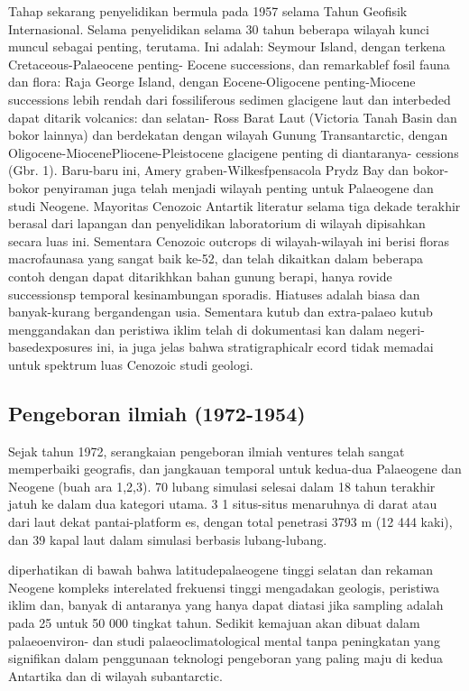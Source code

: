 		Tahap sekarang penyelidikan bermula pada 1957 selama Tahun Geofisik Internasional. Selama penyelidikan selama 30 tahun beberapa wilayah kunci 
	muncul sebagai penting, terutama. Ini adalah: Seymour Island, dengan terkena Cretaceous-Palaeocene penting- Eocene successions, dan remarkablef 
	fosil fauna dan flora: Raja George Island, dengan Eocene-Oligocene penting-Miocene successions lebih rendah dari fossiliferous sedimen glacigene 
	laut dan interbeded dapat ditarik volcanics: dan selatan- Ross Barat Laut (Victoria Tanah Basin dan bokor lainnya) dan berdekatan dengan wilayah 
	Gunung Transantarctic, dengan Oligocene-MiocenePliocene-Pleistocene glacigene penting di diantaranya- cessions (Gbr. 1). 
	Baru-baru ini, Amery graben-Wilkesfpensacola Prydz Bay dan bokor-bokor penyiraman juga telah menjadi wilayah penting untuk Palaeogene dan studi Neogene. 
	Mayoritas Cenozoic Antartik literatur selama tiga dekade terakhir berasal dari lapangan dan penyelidikan laboratorium di wilayah dipisahkan secara luas ini.
	Sementara Cenozoic outcrops di wilayah-wilayah ini berisi floras macrofaunasa yang sangat baik ke-52, dan telah dikaitkan dalam beberapa contoh dengan 
	dapat ditarikhkan bahan gunung berapi, hanya rovide successionsp temporal kesinambungan sporadis. Hiatuses adalah biasa dan banyak-kurang bergandengan usia. 
	Sementara kutub dan extra-palaeo kutub menggandakan dan peristiwa iklim telah di dokumentasi kan dalam negeri-basedexposures ini, 
	ia juga jelas bahwa stratigraphicalr ecord tidak memadai untuk spektrum luas Cenozoic studi geologi.
	
	
\subsection{Pengeboran ilmiah (1972-1954)}

		Sejak tahun 1972, serangkaian pengeboran ilmiah ventures telah sangat memperbaiki geografis, dan jangkauan temporal untuk kedua-dua Palaeogene 
	dan Neogene (buah ara 1,2,3). 70 lubang simulasi selesai dalam 18 tahun terakhir jatuh ke dalam dua kategori utama. 3 1 situs-situs menaruhnya di darat 
	atau dari laut dekat pantai-platform es, dengan total penetrasi 3793 m (12 444 kaki), dan 39 kapal laut dalam simulasi berbasis lubang-lubang.
	
	diperhatikan di bawah bahwa latitudepalaeogene tinggi selatan dan rekaman Neogene kompleks interelated frekuensi tinggi mengadakan geologis, 
	peristiwa iklim dan, banyak di antaranya yang hanya dapat diatasi jika sampling adalah pada 25 untuk 50 000 tingkat tahun. Sedikit kemajuan akan dibuat 
	dalam palaeoenviron- dan studi palaeoclimatological mental tanpa peningkatan yang signifikan dalam penggunaan teknologi pengeboran yang paling maju 
	di kedua Antartika dan di wilayah subantarctic.
	

